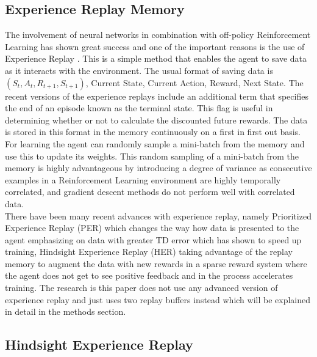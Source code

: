 \subsection{Experience Replay Memory}

The involvement of neural networks in combination with off-policy Reinforcement Learning has shown great success and one of the important reasons is the use of Experience Replay \cite{zhang2018deeper} \cite{fedus2020revisiting}. This is a simple method that enables the agent to save data as it interacts with the environment. The usual format of saving data is $(S_t, A_t, R_{t+1}, S_{t+1})$, Current State, Current Action, Reward, Next State. The recent versions of the experience replays include an additional term that specifies the end of an episode known as the terminal state. This flag is useful in determining whether or not to calculate the discounted future rewards. The data is stored in this format in the memory continuously on a first in first out basis. For learning the agent can randomly sample a mini-batch from the memory and use this to update its weights. This random sampling of a mini-batch from the memory is highly advantageous by introducing a degree of variance as consecutive examples in a Reinforcement Learning environment are highly temporally correlated, and gradient descent methods do not perform well with correlated data. \\

There have been many recent advances with experience replay, namely Prioritized Experience Replay (PER) \cite{schaul2016prioritized} which changes the way how data is presented to the agent emphasizing on data with greater TD error which has shown to speed up training, Hindsight Experience Replay (HER) \cite{andrychowicz2018hindsight} taking advantage of the replay memory to augment the data with new rewards in a sparse reward system where the agent does not get to see positive feedback and in the process accelerates training. The research is this paper does not use any advanced version of experience replay and just uses two replay buffers instead which will be explained in detail in the methods section. \\

\subsection{Hindsight Experience Replay}

